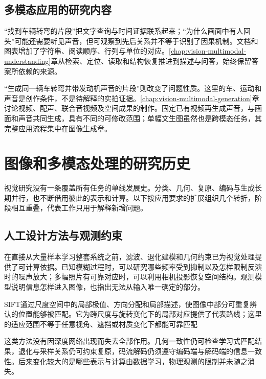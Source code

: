 \subsection{多模态应用的研究内容}
\label{sec:vision-overview-multimodal-tasks}

“找到车辆转弯的片段”把文字查询与时间证据联系起来；“为什么画面中有人回头”可能还需要听见声音，但可观察到先后关系并不等于识别了因果机制。文档和图表增加了字符串、阅读顺序、行列与单位的对应。\ref{chap:vision-multimodal-understanding}章从检索、定位、读取和结构恢复推进到描述与问答，始终保留答案所依赖的来源。

“生成同一辆车转弯并带发动机声音的片段”则改变了问题性质。这里的车、运动和声音是创作条件，不是待解释的实拍证据。\ref{chap:vision-multimodal-generation}章讨论视频、配声、联合音视频及空间成果的制作。固定已有视频再生成声音，与画面和声音共同生成，具有不同的可修改范围；单幅文生图虽然也是跨模态任务，其完整应用流程集中在图像生成章。

\section{图像和多模态处理的研究历史}
\label{sec:vision-overview-history}

视觉研究没有一条覆盖所有任务的单线发展史。分类、几何、复原、编码与生成长期并行，也不断借用彼此的表示和计算。以下按应用要求的扩展组织几个转折，阶段相互重叠，代表工作只用于解释新增问题。

\subsection{人工设计方法与观测约束}
\label{sec:vision-overview-classical-history}

在直接从大量样本学习整套系统之前，滤波、退化建模和几何约束已为视觉处理提供了可计算依据。已知模糊过程时，可以研究哪些频率受到抑制以及怎样限制反演时的噪声放大；多幅照片有可靠对应时，可以利用相机投影恢复空间结构。观测模型说明信息怎样进入图像，也指出无法从输入唯一确定的部分。

SIFT通过尺度空间中的局部极值、方向分配和局部描述，使图像中部分可重复辨认的位置能够被匹配。它为跨尺度与旋转变化下的局部对应提供了代表路线；这里的适应范围不等于任意视角、遮挡或材质变化下都能可靠匹配

这类方法没有因深度网络出现而失去全部作用。几何一致性仍可检查学习式匹配结果，退化与采样关系仍可约束复原，码流解码仍须遵守编码端与解码端的信息一致性。后来变化较大的是哪些表示与计算由数据学习，物理观测的限制并未随之消失。

